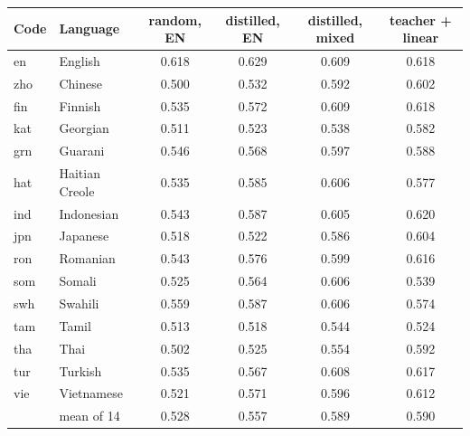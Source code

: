 \begin{tabular}{llcccc}
\toprule
Code & Language & random, EN & distilled, EN & distilled, mixed & teacher + linear\\
\midrule
en & English & 0.618 & 0.629 & 0.609 & 0.618\\
\midrule
zho & Chinese & 0.500 & 0.532 & 0.592 & 0.602\\
fin & Finnish & 0.535 & 0.572 & 0.609 & 0.618\\
kat & Georgian & 0.511 & 0.523 & 0.538 & 0.582\\
grn & Guarani & 0.546 & 0.568 & 0.597 & 0.588\\
hat & Haitian Creole & 0.535 & 0.585 & 0.606 & 0.577\\
ind & Indonesian & 0.543 & 0.587 & 0.605 & 0.620\\
jpn & Japanese & 0.518 & 0.522 & 0.586 & 0.604\\
ron & Romanian & 0.543 & 0.576 & 0.599 & 0.616\\
som & Somali & 0.525 & 0.564 & 0.606 & 0.539\\
swh & Swahili & 0.559 & 0.587 & 0.606 & 0.574\\
tam & Tamil & 0.513 & 0.518 & 0.544 & 0.524\\
tha & Thai & 0.502 & 0.525 & 0.554 & 0.592\\
tur & Turkish & 0.535 & 0.567 & 0.608 & 0.617\\
vie & Vietnamese & 0.521 & 0.571 & 0.596 & 0.612\\
\midrule
& mean of 14 & 0.528 & 0.557 & 0.589 & 0.590\\
\bottomrule
\end{tabular}
